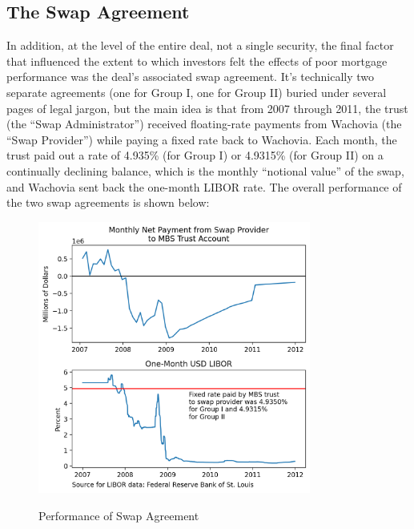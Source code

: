 \documentclass[12pt]{article}
\begin{document}
\subsection*{The Swap Agreement}

In addition, at the level of the entire deal, not a single security, the final factor that influenced the extent to which investors felt the effects of poor mortgage performance was the deal’s associated swap agreement. It’s technically two separate agreements (one for Group I, one for Group II) buried under several pages of legal jargon, but the main idea is that from 2007 through 2011, the trust (the “Swap Administrator”) received floating-rate payments from Wachovia (the “Swap Provider”) while paying a fixed rate back to Wachovia. Each month, the trust paid out a rate of 4.935\% (for Group I) or 4.9315\% (for Group II) on a continually declining balance, which is the monthly “notional value” of the swap, and Wachovia sent back the one-month LIBOR rate. The overall performance of the two swap agreements is shown below:

\begin{figure}[h]
	\centering
	\caption{Performance of Swap Agreement}
	\includegraphics[width=0.8\textwidth]{../figures/timeseries_swap_performance}
	\label{fig:timeseries_swap_performance}
\end{figure}
\end{document}

